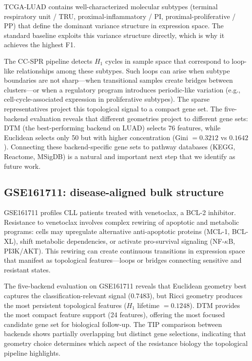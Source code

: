 \documentclass[11pt]{article}
\begin{document}
TCGA-LUAD contains well-characterized molecular subtypes (terminal respiratory unit / TRU, proximal-inflammatory / PI, proximal-proliferative / PP) that define the dominant variance structure in expression space.
The standard baseline exploits this variance structure directly, which is why it achieves the highest F1.

The CC-SPR pipeline detects $H_1$ cycles in sample space that correspond to loop-like relationships among these subtypes.
Such loops can arise when subtype boundaries are not sharp---when transitional samples create bridges between clusters---or when a regulatory program introduces periodic-like variation (e.g., cell-cycle-associated expression in proliferative subtypes).
The sparse representatives project this topological signal to a compact gene set.
The five-backend evaluation reveals that different geometries project to different gene sets: DTM (the best-performing backend on LUAD) selects 76 features, while Euclidean selects only 50 but with higher concentration (Gini $= 0.3212$ vs $0.1642$).
Connecting these backend-specific gene sets to pathway databases (KEGG, Reactome, MSigDB) is a natural and important next step that we identify as future work.

\subsection{GSE161711: disease-aligned bulk structure}

GSE161711 profiles CLL patients treated with venetoclax, a BCL-2 inhibitor.
Resistance to venetoclax involves complex rewiring of apoptotic and metabolic programs: cells may upregulate alternative anti-apoptotic proteins (MCL-1, BCL-XL), shift metabolic dependencies, or activate pro-survival signaling (NF-$\kappa$B, PI3K/AKT).
This rewiring can create continuous transitions in expression space that manifest as topological features---loops or bridges connecting sensitive and resistant states.

The five-backend evaluation on GSE161711 reveals that Euclidean geometry best captures the classification-relevant signal ($0.7483$), but Ricci geometry produces the most persistent topological features ($H_1$ lifetime $= 0.1248$).
DTM provides the most compact feature support (24 features), offering the most focused candidate gene set for biological follow-up.
The TIP comparison between backends shows partially overlapping but distinct gene selections, indicating that geometry choice determines which aspect of the resistance biology the topological pipeline highlights.
\end{document}

